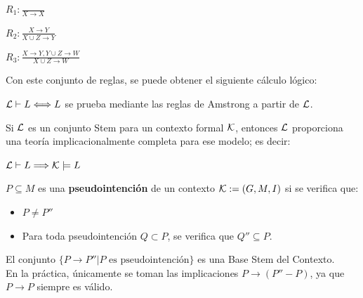 \begin{center}
\begin{minipage}[t]{0.3\linewidth} \centering
	$R_1: \frac{}{X\rightarrow{X}}$
\end{minipage}
\begin{minipage}[t]{0.3\linewidth} \centering
	$R_2: \frac{X\rightarrow{Y}}{X \cup Z \rightarrow{Y}}$
\end{minipage}
\begin{minipage}[t]{0.3\linewidth} \centering
	$R_3: \frac{X\rightarrow{Y}, Y \cup Z \rightarrow{W}}{X \cup Z \rightarrow{W}}$
\end{minipage}
\end{center}

Con este conjunto de reglas, se puede obtener el siguiente cálculo lógico:

\begin{center}
	${\cal L} \vdash L \Longleftrightarrow{L}$ se prueba mediante las reglas de Amstrong a partir de ${\cal L}$.
\end{center}

\begin{teo}
	Si ${\cal L}$ es un conjunto Stem para un contexto formal ${\cal K}$, entonces ${\cal L}$ proporciona una teoría implicacionalmente completa para ese modelo; es decir:
	\begin{center}
	$ {\cal L} \vdash L \Longrightarrow{ {\cal K} \models L }$
	\end{center}
\end{teo}

\begin{defi}
	$P \subseteq M$ es una {\bf pseudointención} de un contexto ${\cal K}:=(G,M,I)$ si se verifica que:
	\begin{itemize}
		\item $P \neq P''$
		\item Para toda pseudointención $Q \subset P$, se verifica que $Q'' \subseteq P$.
	\end{itemize}
\end{defi}

\begin{teo}
	El conjunto $\{P \rightarrow {P''} | P \mbox{ es pseudointención}\}$ es una Base Stem del Contexto. \\
	En la práctica, únicamente se toman las implicaciones $P \rightarrow {(P''-P)}$, ya que $P \rightarrow {P}$ siempre es válido.
\end{teo}

